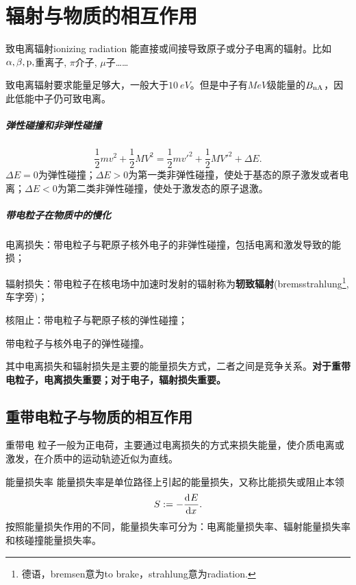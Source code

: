 \chapter{辐射与物质的相互作用}

\begin{definition}{致电离辐射}{ionizing radiation}
	能直接或间接导致原子或分子电离的辐射。比如$\alpha,\beta,\mathrm{p},$重离子, $\pi$介子, $\mu$子……
\end{definition}
致电离辐射要求能量足够大，一般大于$\qty{10}{eV}$。但是中子有$\unit{MeV}$级能量的$B_{\mathrm n\mathrm{A}}$，因此低能中子仍可致电离。
\begin{notecaptionblock}
\end{notecaptionblock}
\paragraph{弹性碰撞和非弹性碰撞}
\[
	\frac12mv^2 + \frac12MV^2 = \frac12mv'^2 + \frac12MV'^2 + \Delta E.
\]
$\Delta E = 0$为弹性碰撞；$\Delta E > 0$为第一类非弹性碰撞，使处于基态的原子激发或者电离；$\Delta E < 0$为第二类非弹性碰撞，使处于激发态的原子退激。
\paragraph{带电粒子在物质中的慢化}
\begin{compactenum}
	\item 电离损失：带电粒子与靶原子核外电子的非弹性碰撞，包括电离和激发导致的能损；
	\item 辐射损失：带电粒子在核电场中加速时发射的辐射称为\textbf{轫致辐射}(bremsstrahlung\footnote{德语，bremsen意为to brake，strahlung意为radiation.}, 车字旁)；
	\item 核阻止：带电粒子与靶原子核的弹性碰撞；
	\item 带电粒子与核外电子的弹性碰撞。
\end{compactenum}
其中电离损失和辐射损失是主要的能量损失方式，二者之间是竞争关系。\textbf{对于重带电粒子，电离损失重要；对于电子，辐射损失重要。}

\section{重带电粒子与物质的相互作用}

重带电 粒子一般为正电荷，主要通过电离损失的方式来损失能量，使介质电离或激发，在介质中的运动轨迹近似为直线。
\begin{definition}{能量损失率}{}
	能量损失率是单位路径上引起的能量损失，又称比能损失或阻止本领
	\begin{align}
		S := -\frac{\mathop{}\!\mathrm{d}^{}E}{\mathrm{d}{x}^{}}.
	\end{align}
	按照能量损失作用的不同，能量损失率可分为：电离能量损失率、辐射能量损失率和核碰撞能量损失率。
\end{definition}


